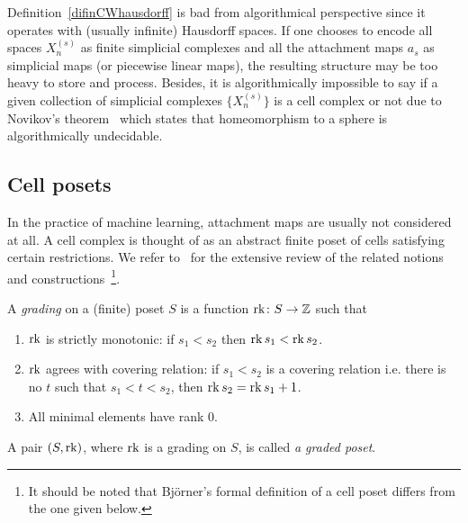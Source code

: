 \begin{rem}\label{remNovikovForman}
Definition~\ref{difinCWhausdorff} is bad from algorithmical perspective since it operates with (usually infinite) Hausdorff spaces. If one chooses to encode all spaces $X_n^{(s)}$ as finite simplicial complexes and all the attachment maps $a_s$ as simplicial maps (or piecewise linear maps), the resulting structure may be too heavy to store and process. Besides, it is algorithmically impossible to say if a given collection of simplicial complexes $\{X_n^{(s)}\}$ is a cell complex or not due to Novikov's theorem~\cite{volodin1974sphere} which states that homeomorphism to a sphere is algorithmically undecidable. %
\end{rem}

\subsection{Cell posets} 

In the practice of machine learning, attachment maps are usually not considered at all. A cell complex is thought of as an abstract finite poset of cells satisfying certain restrictions. We refer to~\cite{bjorner1984poset} for the extensive review of the related notions and constructions~\footnote{It should be noted that Bj\"{o}rner's formal definition of a cell poset differs from the one given below.}. %

\begin{defin}\label{definGrading}\cite{StanleyComb}
A \emph{grading} on a (finite) poset $S$ is a function $\operatorname{rk}\colon S\to\mathbb{Z}$ such that
\begin{enumerate}
  \item $\operatorname{rk}$ is strictly monotonic: if $s_1<s_2$ then $\operatorname{rk} s_1<\operatorname{rk} s_2$.
  \item $\operatorname{rk}$ agrees with covering relation: if $s_1<s_2$ is a covering relation i.e. there is no $t$ such that $s_1<t<s_2$, then $\operatorname{rk} s_2=\operatorname{rk} s_1+1$.%
  \item All minimal elements have rank $0$.
\end{enumerate}
A pair $(S,\operatorname{rk})$, where $\operatorname{rk}$ is a grading on $S$, is called \emph{a graded poset}.
\end{defin}

